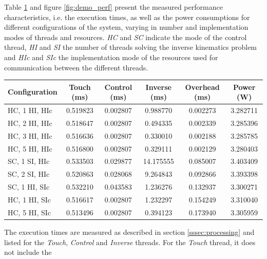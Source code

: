Table \ref{tab:demo_perf} and figure \ref{fig:demo_perf} present the measured
performance characteristics, i.e. the execution times, as well as the power
consumptions for different configurations of the system, varying in number and
implementation modes of threads and resources. \emph{HC} and \emph{SC}
indicate the mode of the control thread, \emph{HI} and \emph{SI} the number of
threads solving the inverse kinematics problem and \emph{HIc} and \emph{SIc}
the implementation mode of the resources used for communication between the
different threads.
\begin{table}
	\scriptsize
	\centering
	\label{tab:demo_perf}
	\begin{tabular}{lccccc}
	\hline
	\textbf{Configuration} & \textbf{Touch (ms)} & \textbf{Control (ms)} & \textbf{Inverse (ms)} & \textbf{Overhead (ms)} & \textbf{Power (W)}\\
	\hline
	HC, 1 HI, HIc & 0.519823 & 0.002807 & 0.988770 & 0.002273 & 3.282711\\
	HC, 2 HI, HIc & 0.518647 & 0.002807 & 0.494335 & 0.002339 & 3.285396\\
	HC, 3 HI, HIc & 0.516636 & 0.002807 & 0.330010 & 0.002188 & 3.285785\\
	HC, 5 HI, HIc & 0.516800 & 0.002807 & 0.329111 & 0.002129 & 3.280403\\
	SC, 1 SI, HIc & 0.533503 & 0.029877 & 14.175555 & 0.085007 & 3.403409\\
	SC, 2 SI, HIc & 0.520863 & 0.028068 & 9.264843 & 0.092866 & 3.393398\\
	SC, 1 HI, SIc & 0.532210 & 0.043583 & 1.236276 & 0.132937 & 3.300271\\
	HC, 1 HI, SIc & 0.516617 & 0.002807 & 1.232297 & 0.154249 & 3.310040\\
	HC, 5 HI, SIc & 0.513496 & 0.002807 & 0.394123 & 0.173940 & 3.305959\\
	\hline
	\end{tabular}
\end{table}
The execution times are measured as described in section
\ref{sssec:processing} and listed for the \emph{Touch}, \emph{Control} and
\emph{Inverse} threads. For the \emph{Touch} thread, it does not include the
